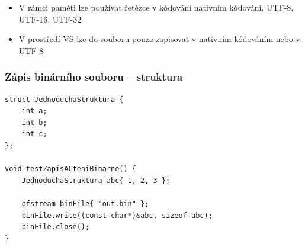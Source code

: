 \begin{frame}[fragile]
\begin{block}{}
\begin{itemize}
\item V rámci paměti lze používat řetězce v kódování nativním kódování, UTF-8, UTF-16, UTF-32
\item V prostředí VS lze do souboru pouze zapisovat v nativním kódováním nebo v UTF-8
\end{itemize}
\end{block}
\end{frame}









\begin{frame}[fragile]
\frametitle{Zápis binárního souboru -- struktura}
\begin{yesblock}
\begin{lstlisting}
struct JednoduchaStruktura {
	int a;
	int b;
	int c;
};

void testZapisACteniBinarne() {
	JednoduchaStruktura abc{ 1, 2, 3 };
	
	ofstream binFile{ "out.bin" };
	binFile.write((const char*)&abc, sizeof abc);
	binFile.close();
}

\end{lstlisting}
\end{yesblock}
\end{frame}













